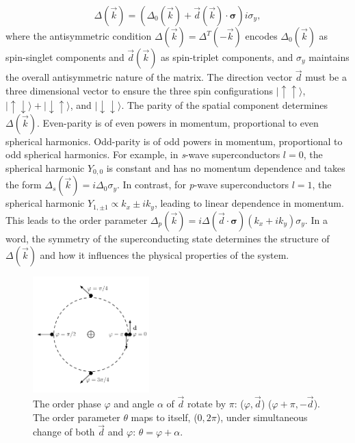 \begin{equation}
  \Delta (\vec{k}) = \left(\Delta_0 (\vec{k}) + \vec{d}(\vec{k}) \cdot \bm{\sigma}\right) i \sigma_y,
\end{equation}
where the antisymmetric condition $\Delta(\vec{k}) = \Delta^T(-\vec{k})$ encodes $\Delta_0 (\vec{k})$ as spin-singlet components and $\vec{d}(\vec{k})$ as spin-triplet components, and $\sigma_y$ maintains the overall antisymmetric nature of the matrix.
The direction vector $\vec{d}$ must be a three dimensional vector to ensure the three spin configurations
$|\uparrow\uparrow\rangle$, $|\uparrow\downarrow\rangle + |\downarrow\uparrow\rangle$, and $|\downarrow\downarrow\rangle$.
The parity of the spatial component determines $\Delta(\vec{k})$.
Even-parity is of even powers in momentum, proportional to even spherical harmonics.
Odd-parity is of odd powers in momentum, proportional to odd spherical harmonics.
For example, in \textit{s}-wave superconductors $l=0$, the spherical harmonic $Y_{0,0}$ is constant and has no momentum dependence and takes the form
$\Delta_s (\vec{k}) = i\Delta_0 \sigma_y$.
In contrast, for \textit{p}-wave superconductors $l=1$, the spherical harmonic $Y_{1,\pm1} \propto k_x \pm i k_y$, leading to linear dependence in momentum.
This leads to the order parameter
$\Delta_p(\vec{k}) = i\Delta (\vec{d} \cdot \bm{\sigma}) (k_x+ik_y) \sigma_y$.
In a word, the symmetry of the superconducting state determines the structure of $\Delta(\vec{k})$ and how it influences the physical properties of the system.

\begin{figure}
  \includegraphics[width=0.4\textwidth]{./figures/half-quantum-vortex.pdf}
  \caption{The order phase $\varphi$ and angle $\alpha$ of $\vec{d}$ rotate by $\pi$: ($\varphi , \vec{d}$) \rightarrow ($\varphi+\pi, -\vec{d}$). The order parameter $\theta$ maps to itself, ($0, 2\pi$), under simultaneous change of both $\vec{d}$ and $\varphi$: $\theta = \varphi + \alpha$.}
  \label{fig:half-quantum-vortex}
\end{figure}

